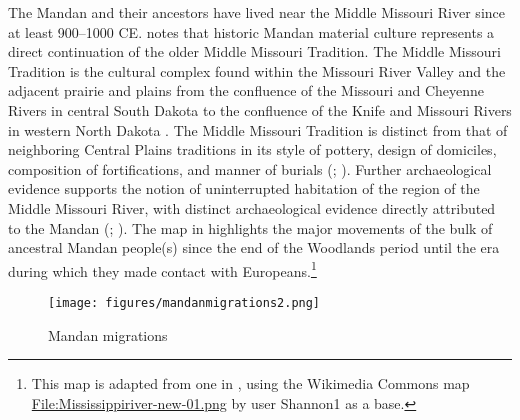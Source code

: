 The Mandan and their ancestors have lived near the Middle Missouri River since at least 900--1000 CE. %
\citet[203]{lehmer1971} notes that historic Mandan material culture represents a direct continuation of the older Middle Missouri Tradition. The Middle Missouri Tradition is the cultural complex found within the Missouri River Valley and the adjacent prairie and plains from the confluence of the Missouri and Cheyenne Rivers in central South Dakota to the confluence of the Knife and Missouri Rivers in western North Dakota \citep[84]{will1906}.  The Middle Missouri Tradition is distinct from that of neighboring Central Plains traditions in its style of pottery, design of domiciles, composition of fortifications, and manner of burials (\citealt[202]{lehmer1971}; \citealt[10]{johnson2007}). Further archaeological evidence supports the notion of uninterrupted habitation of the region of the Middle Missouri River, with distinct archaeological evidence directly attributed to the Mandan (\citealt[97]{lehmer1971}; \citealt[109]{johnson2007}). The map in  highlights the major movements of the bulk of ancestral Mandan people(s) since the end of the Woodlands period until the era during which they made contact with Europeans.\footnote{This map is adapted from one in \citet[5]{fenn2015}, using the Wikimedia Commons map \href{https://commons.wikimedia.org/wiki/File:Mississippiriver-new-01.png}{File:Mississippiriver-new-01.png} by user Shannon1 as a base.}

\begin{figure}[t]
\caption{Mandan migrations}
\label{mandanmigration}
\texttt{[image: figures/mandanmigrations2.png]}
\end{figure}

